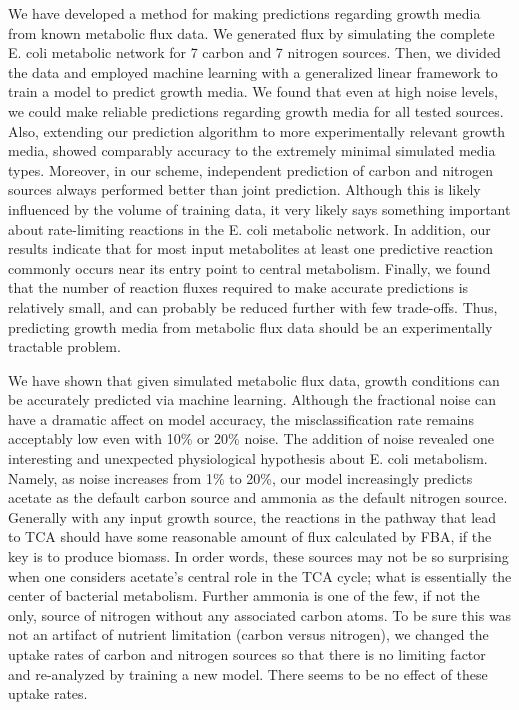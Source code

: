 \documentclass[12pt]{article}
\begin{document}
We have developed a method for making predictions regarding growth media from known metabolic flux data. We generated flux by simulating the complete E. coli metabolic network for 7 carbon and 7 nitrogen sources. Then, we divided the data and employed machine learning with a generalized linear framework to train a model to predict growth media. We found that even at high noise levels, we could make reliable predictions regarding growth media for all tested sources. Also, extending our prediction algorithm to more experimentally relevant growth media, showed comparably accuracy to the extremely minimal simulated media types. Moreover, in our scheme, independent prediction of carbon and nitrogen sources always performed better than joint prediction. Although this is likely influenced by the volume of training data, it very likely says something important about rate-limiting reactions in the E. coli metabolic network. In addition, our results indicate that for most input metabolites at least one predictive reaction commonly occurs near its entry point to central metabolism. Finally, we found that the number of reaction fluxes required to make accurate predictions is relatively small, and can probably be reduced further with few trade-offs. Thus, predicting growth media from metabolic flux data should be an experimentally tractable problem.

We have shown that given simulated metabolic flux data, growth conditions can be accurately predicted via machine learning. Although the fractional noise can have a dramatic affect on model accuracy, the misclassification rate remains acceptably low even with 10\% or 20\% noise. The addition of noise revealed one interesting and unexpected physiological hypothesis about E. coli metabolism. Namely, as noise increases from 1\% to 20\%, our model increasingly predicts acetate as the default carbon source and ammonia as the default nitrogen source.  Generally with any input growth source, the reactions in the pathway that lead to TCA should have some reasonable amount of flux calculated by FBA, if the key is to produce biomass. In order words, these sources may not be so surprising when one considers acetate's central role in the TCA cycle; what is essentially the center of bacterial metabolism. Further ammonia is one of the few, if not the only, source of nitrogen without any associated carbon atoms. To be sure this was not an artifact of nutrient limitation (carbon versus nitrogen), we changed the uptake rates of carbon and nitrogen sources so that there is no limiting factor and re-analyzed by training a new model. There seems to be no effect of these uptake rates.
\end{document}
